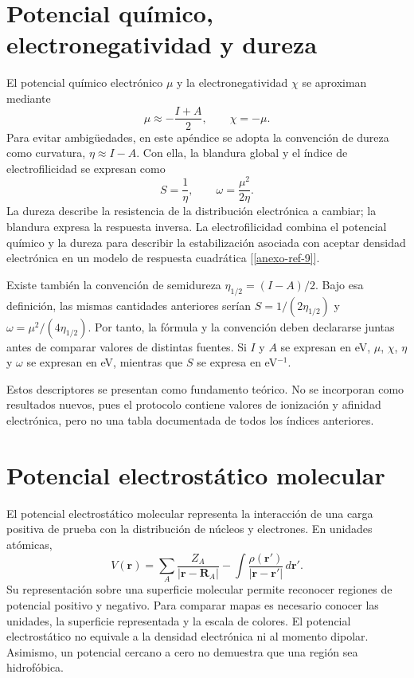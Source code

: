 \section{Potencial químico, electronegatividad y dureza}
El potencial químico electrónico $\mu$ y la electronegatividad $\chi$ se aproximan mediante
\begin{equation}
 \mu\approx-\frac{I+A}{2},\qquad \chi=-\mu.
\end{equation}
Para evitar ambigüedades, en este apéndice se adopta la convención de dureza como curvatura, $\eta\approx I-A$. Con ella, la blandura global y el índice de electrofilicidad se expresan como
\begin{equation}
 S=\frac{1}{\eta},\qquad \omega=\frac{\mu^2}{2\eta}.
\end{equation}
La dureza describe la resistencia de la distribución electrónica a cambiar; la blandura expresa la respuesta inversa. La electrofilicidad combina el potencial químico y la dureza para describir la estabilización asociada con aceptar densidad electrónica en un modelo de respuesta cuadrática [\ref{anexo-ref-9}].

Existe también la convención de semidureza $\eta_{1/2}=(I-A)/2$. Bajo esa definición, las mismas cantidades anteriores serían $S=1/(2\eta_{1/2})$ y $\omega=\mu^2/(4\eta_{1/2})$. Por tanto, la fórmula y la convención deben declararse juntas antes de comparar valores de distintas fuentes. Si $I$ y $A$ se expresan en eV, $\mu$, $\chi$, $\eta$ y $\omega$ se expresan en eV, mientras que $S$ se expresa en eV$^{-1}$.

Estos descriptores se presentan como fundamento teórico. No se incorporan como resultados nuevos, pues el protocolo contiene valores de ionización y afinidad electrónica, pero no una tabla documentada de todos los índices anteriores.

\section{Potencial electrostático molecular}
El potencial electrostático molecular representa la interacción de una carga positiva de prueba con la distribución de núcleos y electrones. En unidades atómicas,
\begin{equation}
 V(\mathbf r)=\sum_A\frac{Z_A}{|\mathbf r-\mathbf R_A|}
 -\int\frac{\rho(\mathbf r')}{|\mathbf r-\mathbf r'|}\,d\mathbf r'.
\end{equation}
Su representación sobre una superficie molecular permite reconocer regiones de potencial positivo y negativo. Para comparar mapas es necesario conocer las unidades, la superficie representada y la escala de colores. El potencial electrostático no equivale a la densidad electrónica ni al momento dipolar. Asimismo, un potencial cercano a cero no demuestra que una región sea hidrofóbica.





